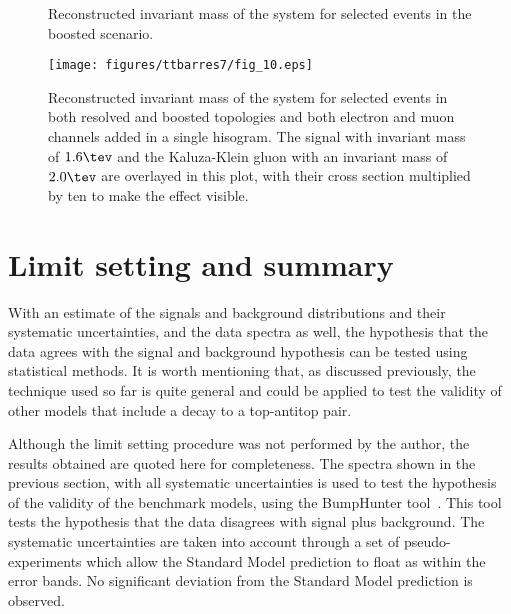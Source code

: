 \begin{sidewaysfigure}
\centering
{}
\caption{Reconstructed invariant mass of the \ttbar system for selected events in the boosted scenario.}
\label{fig:ttres7_boosted_mtt}
\end{sidewaysfigure}

\begin{sidewaysfigure}
\centering
\texttt{[image: figures/ttbarres7/fig\_10.eps]}
\caption{Reconstructed invariant mass of the \ttbar system for selected events in both resolved and boosted topologies and both electron and muon channels added in a single hisogram. The \zprime signal with invariant mass of $1.6\tev$ and the Kaluza-Klein gluon with an invariant mass of $2.0\tev$ are overlayed in this plot, with their cross section multiplied by ten to make the effect visible.}
\label{fig:ttres7_mtt_signal}
\end{sidewaysfigure}

\clearpage





\section{Limit setting and summary}

With an estimate of the signals and background \mtt distributions and 
their systematic uncertainties, and the data \mtt spectra as well,
the hypothesis that the data agrees with the signal and background hypothesis can be tested using statistical methods.
It is worth mentioning that, as discussed previously, the
technique used so far is quite general and could be applied to test the validity of other models that include a decay to a top-antitop pair.

Although the limit setting procedure was not performed by the author,
the results obtained are quoted here for completeness.
The \mtt spectra shown in the previous section, with all systematic
uncertainties is used to test the hypothesis of the validity
of the benchmark models, using the BumpHunter tool~\cite{bumphunter}. This tool tests the hypothesis that the data disagrees with signal plus background.
The systematic uncertainties are taken into account through a set of pseudo-experiments which allow the Standard Model prediction to float as
within the error bands. No significant deviation from the Standard Model prediction is observed.

